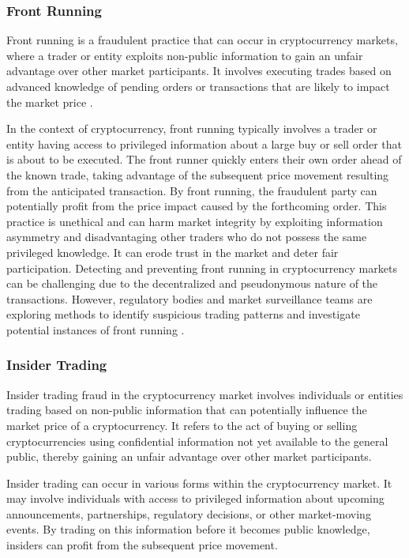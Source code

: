 \subsubsection{Front Running}
Front running is a fraudulent practice that can occur in cryptocurrency markets, where a trader or entity exploits non-public information to gain an
unfair advantage over other market participants. It involves executing trades based on advanced knowledge of pending orders or transactions that are
likely to impact the market price \cite{van2021front}.

In the context of cryptocurrency, front running typically involves a trader or entity having access to privileged information about a large buy or sell
order that is about to be executed. The front runner quickly enters their own order ahead of the known trade, taking advantage of the subsequent price
movement resulting from the anticipated transaction. By front running, the fraudulent party can potentially profit from the price impact caused by the
forthcoming order. This practice is unethical and can harm market integrity by exploiting information asymmetry and disadvantaging other traders who do
not possess the same privileged knowledge. It can erode trust in the market and deter fair participation. Detecting and preventing front running in
cryptocurrency markets can be challenging due to the decentralized and pseudonymous nature of the transactions. However, regulatory bodies and market
surveillance teams are exploring methods to identify suspicious trading patterns and investigate potential instances of front running
\cite{bistarelli2018front}.

\subsubsection{Insider Trading}
Insider trading fraud in the cryptocurrency market involves individuals or entities trading based on non-public information that can potentially influence
the market price of a cryptocurrency. It refers to the act of buying or selling cryptocurrencies using confidential information not yet available to the
general public, thereby gaining an unfair advantage over other market participants.

Insider trading can occur in various forms within the cryptocurrency market. It may involve individuals with access to privileged information about
upcoming announcements, partnerships, regulatory decisions, or other market-moving events. By trading on this information before it becomes public
knowledge, insiders can profit from the subsequent price movement.

